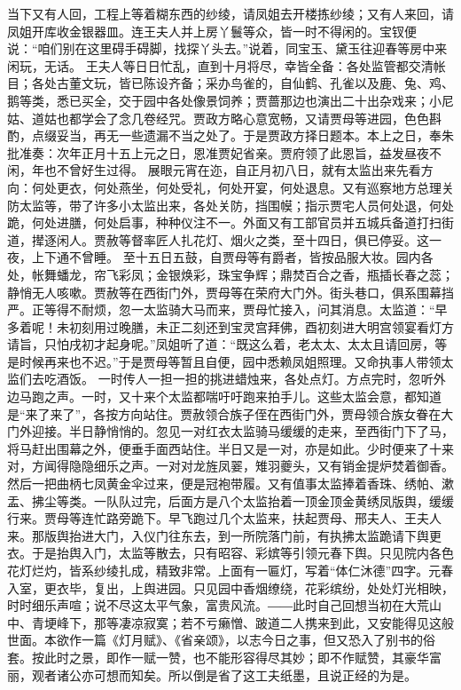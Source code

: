 \documentclass[12pt,oneside]{book}
\begin{document}
当下又有人回，工程上等着糊东西的纱绫，请凤姐去开楼拣纱绫；又有人来回，请凤姐开库收金银器皿。连王夫人并上房丫鬟等众，皆一时不得闲的。宝钗便说：“咱们别在这里碍手碍脚，找探丫头去。”说着，同宝玉、黛玉往迎春等房中来闲玩，无话。
王夫人等日日忙乱，直到十月将尽，幸皆全备：各处监管都交清帐目；各处古董文玩，皆已陈设齐备；采办鸟雀的，自仙鹤、孔雀以及鹿、兔、鸡、鹅等类，悉已买全，交于园中各处像景饲养；贾蔷那边也演出二十出杂戏来；小尼姑、道姑也都学会了念几卷经咒。贾政方略心意宽畅，又请贾母等进园，色色斟酌，点缀妥当，再无一些遗漏不当之处了。于是贾政方择日题本。本上之日，奉朱批准奏：次年正月十五上元之日，恩准贾妃省亲。贾府领了此恩旨，益发昼夜不闲，年也不曾好生过得。
展眼元宵在迩，自正月初八日，就有太监出来先看方向：何处更衣，何处燕坐，何处受礼，何处开宴，何处退息。又有巡察地方总理关防太监等，带了许多小太监出来，各处关防，挡围幙；指示贾宅人员何处退，何处跪，何处进膳，何处启事，种种仪注不一。外面又有工部官员并五城兵备道打扫街道，撵逐闲人。贾赦等督率匠人扎花灯、烟火之类，至十四日，俱已停妥。这一夜，上下通不曾睡。
至十五日五鼓，自贾母等有爵者，皆按品服大妆。园内各处，帐舞蟠龙，帘飞彩凤；金银焕彩，珠宝争辉；鼎焚百合之香，瓶插长春之蕊；静悄无人咳嗽。贾赦等在西街门外，贾母等在荣府大门外。街头巷口，俱系围幕挡严。正等得不耐烦，忽一太监骑大马而来，贾母忙接入，问其消息。太监道：“早多着呢！未初刻用过晚膳，未正二刻还到宝灵宫拜佛，酉初刻进大明宫领宴看灯方请旨，只怕戌初才起身呢。”凤姐听了道：“既这么着，老太太、太太且请回房，等是时候再来也不迟。”于是贾母等暂且自便，园中悉赖凤姐照理。又命执事人带领太监们去吃酒饭。
一时传人一担一担的挑进蜡烛来，各处点灯。方点完时，忽听外边马跑之声。一时，又十来个太监都喘吁吁跑来拍手儿。这些太监会意，都知道是“来了来了”，各按方向站住。贾赦领合族子侄在西街门外，贾母领合族女眷在大门外迎接。半日静悄悄的。忽见一对红衣太监骑马缓缓的走来，至西街门下了马，将马赶出围幕之外，便垂手面西站住。半日又是一对，亦是如此。少时便来了十来对，方闻得隐隐细乐之声。一对对龙旌凤翣，雉羽夔头，又有销金提炉焚着御香。然后一把曲柄七凤黄金伞过来，便是冠袍带履。又有值事太监捧着香珠、绣帕、漱盂、拂尘等类。一队队过完，后面方是八个太监抬着一顶金顶金黄绣凤版舆，缓缓行来。贾母等连忙路旁跪下。早飞跑过几个太监来，扶起贾母、邢夫人、王夫人来。那版舆抬进大门，入仪门往东去，到一所院落门前，有执拂太监跪请下舆更衣。于是抬舆入门，太监等散去，只有昭容、彩嫔等引领元春下舆。只见院内各色花灯烂灼，皆系纱绫扎成，精致非常。上面有一匾灯，写着“体仁沐德”四字。元春入室，更衣毕，复出，上舆进园。只见园中香烟缭绕，花彩缤纷，处处灯光相映，时时细乐声喧；说不尽这太平气象，富贵风流。――此时自己回想当初在大荒山中、青埂峰下，那等凄凉寂寞；若不亏癞憎、跛道二人携来到此，又安能得见这般世面。本欲作一篇《灯月赋》、《省亲颂》，以志今日之事，但又恐入了别书的俗套。按此时之景，即作一赋一赞，也不能形容得尽其妙；即不作赋赞，其豪华富丽，观者诸公亦可想而知矣。所以倒是省了这工夫纸墨，且说正经的为是。
\end{document}
